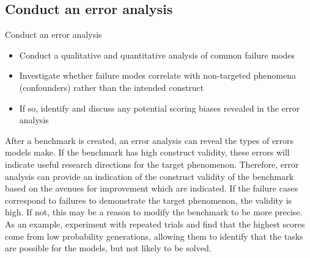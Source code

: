 \subsection{Conduct an error analysis}
\begin{checklistbox}{Conduct an error analysis}
    \begin{itemize}[leftmargin=5pt, label=\scriptsize$\square$]
    \item Conduct a qualitative and quantitative analysis of common failure modes
    \item Investigate whether failure modes correlate with non-targeted phenomena (confounders) rather than the intended construct
    \item If so, identify and discuss any potential scoring biases revealed in the error analysis
\end{itemize}
\end{checklistbox}

After a benchmark is created, an error analysis can reveal the types of errors models make. If the benchmark has high construct validity, these errors will indicate useful research directions for the target phenomenon. Therefore, error analysis can provide an indication of the construct validity of the benchmark based on the avenues for improvement which are indicated. If the failure cases correspond to failures to demonstrate the target phenomenon, the validity is high. If not, this may be a reason to modify the benchmark to be more precise. As an example, \citeauthor{phuongEvaluatingFrontierModels2024a} experiment with repeated trials and find that the highest scores come from low probability generations, allowing them to identify that the tasks are possible for the models, but not likely to be solved.

